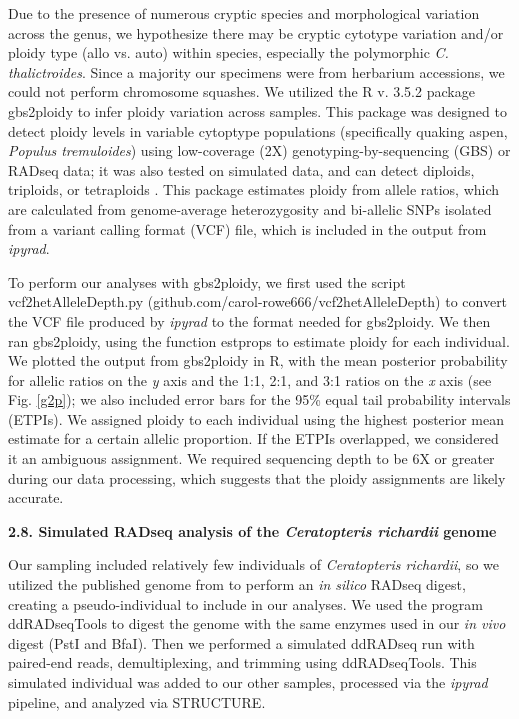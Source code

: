 \documentclass[12pt]{article}
\begin{document}
\begin{flushleft}
Due to the presence of numerous cryptic species and morphological variation across the genus, we hypothesize there may be cryptic cytotype variation and/or ploidy type (allo vs. auto) within species, especially the polymorphic \textit{C. thalictroides}. Since a majority our specimens were from herbarium accessions, we could not perform chromosome squashes. We utilized the R v. 3.5.2 \autocite{R_352} package gbs2ploidy to infer ploidy variation across samples. This package was designed to detect ploidy levels in variable cytoptype populations (specifically quaking aspen, \textit{Populus tremuloides}) using low-coverage (2X) genotyping-by-sequencing (GBS) or RADseq data; it was also tested on simulated data, and can detect diploids, triploids, or tetraploids \autocite{Gompert2017}. This package estimates ploidy from allele ratios, which are calculated from genome-average heterozygosity and bi-allelic SNPs isolated from a variant calling format (VCF) file, which is included in the output from \textit{ipyrad}.

To perform our analyses with gbs2ploidy, we first used the script vcf2hetAlleleDepth.py (github.com/carol-rowe666/vcf2hetAlleleDepth) to convert the VCF file produced by \textit{ipyrad} to the format needed for gbs2ploidy. We then ran gbs2ploidy, using the function estprops to estimate ploidy for each individual. We plotted the output from gbs2ploidy in R, with the mean posterior probability for allelic ratios on the \textit{y} axis and the 1:1, 2:1, and 3:1 ratios on the \textit{x} axis (see Fig. \ref{g2p}); we also included error bars for the 95\% equal tail probability intervals (ETPIs). We assigned ploidy to each individual using the  highest posterior mean estimate for a certain allelic proportion. If the ETPIs overlapped, we considered it an ambiguous assignment. We required sequencing depth to be 6X or greater during our data processing, which suggests that the ploidy assignments are likely accurate.

\textbf{2.8. Simulated RADseq analysis of the \textit{Ceratopteris richardii} genome}

Our sampling included relatively few individuals of \textit{Ceratopteris richardii}, so we utilized the published genome from \textcite{Marchant2019} to perform an \textit{in silico} RADseq digest, creating a pseudo-individual to include in our analyses. We used the program ddRADseqTools \autocite{Mora-Marquez2017} to digest the genome with the same enzymes used in our \textit{in vivo} digest (PstI and BfaI). Then we performed a simulated ddRADseq run with paired-end reads, demultiplexing, and trimming using ddRADseqTools. This simulated individual was added to our other samples, processed via the \textit{ipyrad} pipeline, and analyzed via STRUCTURE. 


\end{flushleft}
\end{document}
